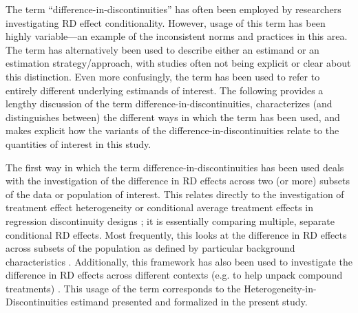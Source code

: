 \documentclass[12pt]{article}
\begin{document}
The term ``difference-in-discontinuities'' has often been employed by researchers investigating RD effect conditionality. However, usage of this term has been highly variable---an example of the inconsistent norms and practices in this area. The term has alternatively been used to describe either an estimand or an estimation strategy/approach, with studies often not being explicit or clear about this distinction. Even more confusingly, the term has been used to refer to entirely different underlying estimands of interest. The following provides a lengthy discussion of the term difference-in-discontinuities, characterizes (and distinguishes between) the different ways in which the term has been used, and makes explicit how the variants of the difference-in-discontinuities relate to the quantities of interest in this study.

The first way in which the term difference-in-discontinuities has been used deals with the investigation of the difference in RD effects across two (or more) subsets of the data or population of interest. This relates directly to the investigation of treatment effect heterogeneity or conditional average treatment effects in regression discontinuity designs \citep[e.g.][]{hsu2019testing, becker2013absorptive}; it is essentially comparing multiple, separate conditional RD effects. Most frequently, this looks at the difference in RD effects across subsets of the population as defined by particular background characteristics \citep[e.g.][]{lalive2007unemployment,card2016,micozzi2019,desai2021}. Additionally, this framework has also been used to investigate the difference in RD effects across different contexts (e.g. to help unpack compound treatments) \citep{card2016}. This usage of the term corresponds to the Heterogeneity-in-Discontinuities estimand presented and formalized in the present study.
\end{document}
